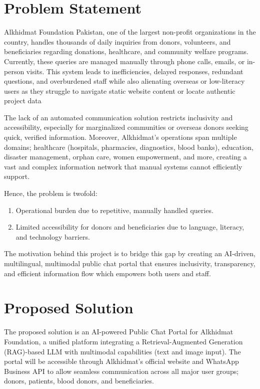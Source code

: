 \section{Problem Statement}

Alkhidmat Foundation Pakistan, one of the largest non-profit organizations in the country, handles thousands of daily inquiries from donors, volunteers, and beneficiaries regarding donations, healthcare, and community welfare programs. Currently, these queries are managed manually through phone calls, emails, or in-person visits. This system leads to inefficiencies, delayed responses, redundant questions, and overburdened staff while also alienating overseas or low-literacy users as they struggle to navigate static website content or locate authentic project data 

The lack of an automated communication solution restricts inclusivity and accessibility, especially for marginalized communities or overseas donors seeking quick, verified information. Moreover, Alkhidmat’s operations span multiple domains; healthcare (hospitals, pharmacies, diagnostics, blood banks), education, disaster management, orphan care, women empowerment, and more, creating a vast and complex information network that manual systems cannot efficiently support. 

Hence, the problem is twofold:
\begin{enumerate}\setlength{\itemsep}{0pt}
    \item Operational burden due to repetitive, manually handled queries. 
    \item Limited accessibility for donors and beneficiaries due to language, literacy, and technology barriers. 
\end{enumerate}

The motivation behind this project is to bridge this gap by creating an AI-driven, multilingual, multimodal public chat portal that ensures inclusivity, transparency, and efficient information flow which empowers both users and staff. 

\section{Proposed Solution}

The proposed solution is an AI-powered Public Chat Portal for Alkhidmat Foundation, a unified platform integrating a Retrieval-Augmented Generation (RAG)-based LLM with multimodal capabilities (text and image input). The portal will be accessible through Alkhidmat’s official website and WhatsApp Business API to allow seamless communication across all major user groups; donors, patients, blood donors, and beneficiaries. 

